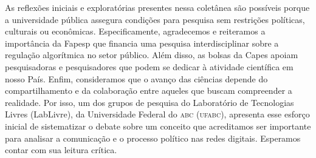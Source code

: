 As reflexões iniciais e exploratórias presentes nessa coletânea são
possíveis porque a universidade pública assegura condições para pesquisa
sem restrições políticas, culturais ou econômicas. Especificamente,
agradecemos e reiteramos a importância da Fapesp que financia uma
pesquisa interdisciplinar sobre a regulação algorítmica no setor
público. Além disso, as bolsas da Capes apoiam pesquisadoras e
pesquisadores que podem se dedicar à atividade científica em nosso País.
Enfim, consideramos que o avanço das ciências depende do
compartilhamento e da colaboração entre aqueles que buscam
compreender a realidade. Por isso, um dos grupos de pesquisa do
Laboratório de Tecnologias Livres (LabLivre), da Universidade Federal do \textsc{abc}
(\textsc{ufabc}), apresenta esse esforço inicial de sistematizar o debate sobre um
conceito que acreditamos ser importante para analisar a comunicação e o
processo político nas redes digitais. Esperamos contar com sua leitura
crítica.


